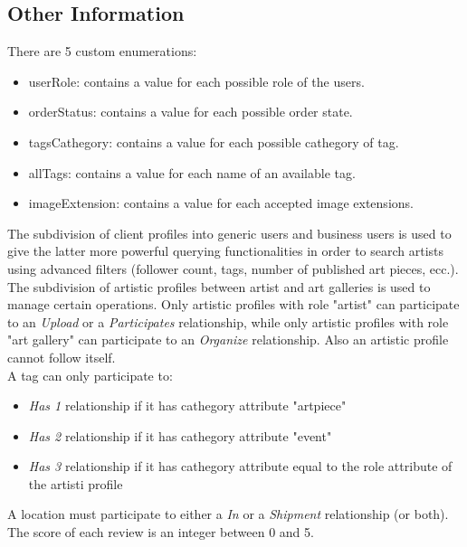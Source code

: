 \subsection{Other Information}


There are 5 custom enumerations:
\begin{itemize}
    \item userRole: contains a value for each possible role of the users.
    \item orderStatus: contains a value for each possible order state.
    \item tagsCathegory: contains a value for each possible cathegory of tag.
    \item allTags: contains a value for each name of an available tag.
    \item imageExtension: contains a value for each accepted image extensions.
\end{itemize}
The subdivision of client profiles into generic users and business users is used to give the latter more powerful querying
functionalities in order to search artists using advanced filters (follower count, tags, number of published art pieces, ecc.).\\
The subdivision of artistic profiles between artist and art galleries is used to manage certain operations. Only artistic 
profiles with role "artist" can participate to an \textit{Upload} or a \textit{Participates} relationship, while only artistic profiles with role
"art gallery" can participate to an \textit{Organize} relationship. Also an artistic profile cannot follow itself.\\
A tag can only participate to:
\begin{itemize}
    \item \textit{Has 1} relationship if it has cathegory attribute "artpiece"
    \item \textit{Has 2} relationship if it has cathegory attribute "event"
    \item \textit{Has 3} relationship if it has cathegory attribute equal to the role attribute of the artisti profile
\end{itemize}
A location must participate to either a \textit{In} or a \textit{Shipment} relationship (or both).\\
The score of each review is an integer between 0 and 5.